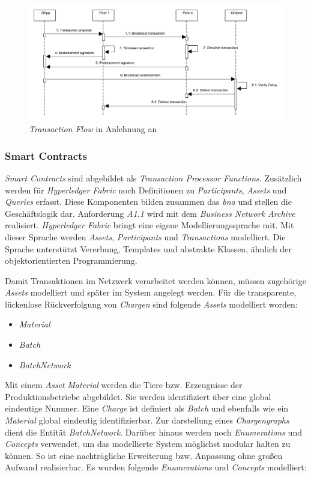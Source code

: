 \begin{figure}[H]
	\centering
	\includegraphics[width=1\linewidth]{pictures/transaction-flow}
	\caption[\textit{Transaction Flow}]{\textit{Transaction Flow} in Anlehnung an \citep{Choudhury2018}}
	\label{fig:transaction-flow}
\end{figure}

\subsubsection{Smart Contracts}\label{smart-contracts}
\textit{Smart Contracts} sind abgebildet als \textit{Transaction Processor Functions}. Zusätzlich werden für \textit{Hyperledger Fabric} noch Definitionen zu \textit{Participants}, \textit{Assets} und \textit{Queries} erfasst. Diese Komponenten bilden zusammen das \textit{\ac{bna}} und stellen die Geschäftslogik dar. Anforderung \textit{A1.1} wird mit dem \textit{Business Network Archive} realisiert. \textit{Hyperledger Fabric} bringt eine eigene Modellierungssprache mit. Mit dieser Sprache werden \textit{Assets}, \textit{Participants} und \textit{Transactions} modelliert. Die Sprache unterstützt Vererbung, Templates und abstrakte Klassen, ähnlich der objektorientierten Programmierung.

Damit Transaktionen im Netzwerk verarbeitet werden können, müssen zugehörige \textit{Assets} modelliert und später im System angelegt werden. Für die transparente, lückenlose Rückverfolgung von \textit{Chargen} sind folgende \textit{Assets} modelliert worden:

\begin{itemize}
	\item \textit{Material}
	\item \textit{Batch}
	\item \textit{BatchNetwork}
\end{itemize}

\noindent
Mit einem \textit{Asset} \textit{Material} werden die Tiere bzw. Erzeugnisse der Produktionsbetriebe abgebildet. Sie werden identifiziert über eine global eindeutige Nummer. Eine \textit{Charge} ist definiert als \textit{Batch} und ebenfalls wie ein \textit{Material} global eindeutig identifizierbar. Zur darstellung eines \textit{Chargengraphs} dient die Entität \textit{BatchNetwork}. Darüber hinaus werden noch \textit{Enumerations} und \textit{Concepts} verwendet, um das modellierte System möglichst modular halten zu können. So ist eine nachträgliche Erweiterung bzw. Anpassung ohne großen Aufwand realisierbar. Es wurden folgende \textit{Enumerations} und \textit{Concepts} modelliert:

